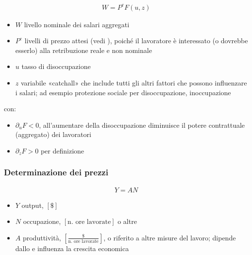 \documentclass[letterpaper,10pt,italian]{jupyterBook}
\begin{document}
\begin{equation}\label{equation:ch/macro:eq:wages-prices}
\begin{split}W = P^e F(u,z)\end{split}
\end{equation}\begin{itemize}
\item {} 
\sphinxAtStartPar
\(W\) livello nominale dei salari aggregati

\item {} 
\sphinxAtStartPar
\(P^e\) livelli di prezzo attesi (vedi {\hyperref[\detokenize{ch/macro:economics-hs-macro-extra-expectations}]{}}), poiché il lavoratore è interessato (o dovrebbe esserlo) alla retribuzione reale e non nominale

\item {} 
\sphinxAtStartPar
\(u\) tasso di disoccupazione

\item {} 
\sphinxAtStartPar
\(z\) variabile «catchall» che include tutti gli altri fattori che possono influenzare i salari; ad esempio protezione sociale per disoccupazione, inoccupazione

\end{itemize}

\sphinxAtStartPar
con:
\begin{itemize}
\item {} 
\sphinxAtStartPar
\(\partial_u F < 0\), all’aumentare della disoccupazione diminuisce il potere contrattuale (aggregato) dei lavoratori

\item {} 
\sphinxAtStartPar
\(\partial_z F > 0\) per definizione

\end{itemize}
\subsubsection*{Determinazione dei prezzi}
\begin{equation*}
\begin{split}Y = A N\end{split}
\end{equation*}\begin{itemize}
\item {} 
\sphinxAtStartPar
\(Y\) output, \(\left[\$\right]\)

\item {} 
\sphinxAtStartPar
\(N\) occupazione, \(\left[\text{n. ore lavorate}\right]\) o altre {\hyperref[\detokenize{ch/macro:economics-hs-macro-medium-run-jobs-market-stats}]{}}

\item {} 
\sphinxAtStartPar
\(A\) produttività, \(\left[\frac{\$}{\text{n. ore lavorate}}\right]\), o riferito a altre misure del lavoro; dipende dallo {\hyperref[\detokenize{ch/macro:economics-hs-macro-long-run-progress}]{}} e influenza la crescita economica

\end{itemize}
\end{document}
